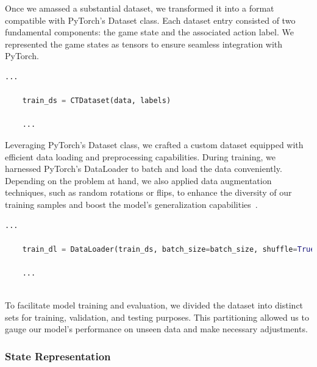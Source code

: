 Once we amassed a substantial dataset, we transformed it into a format compatible with PyTorch's Dataset class. 
Each dataset entry consisted of two fundamental components: the game state and the associated action label. We represented 
the game states as tensors to ensure seamless integration with PyTorch.

\begin{lstlisting}[language=Python]
    ...

    train_ds = CTDataset(data, labels)

    ...

\end{lstlisting}

Leveraging PyTorch's Dataset class, we crafted a custom dataset equipped with efficient data loading and preprocessing capabilities. 
During training, we harnessed PyTorch's DataLoader to batch and load the data conveniently. 
Depending on the problem at hand, we also applied data augmentation techniques, such as random rotations or flips, 
to enhance the diversity of our training samples and boost the model's generalization capabilities~\cite{Onl:dataAug}.

\begin{lstlisting}[language=Python]
    ...

    train_dl = DataLoader(train_ds, batch_size=batch_size, shuffle=True)

    ...
    
\end{lstlisting}

To facilitate model training and evaluation, we divided the dataset into distinct sets for training, validation, 
and testing purposes. This partitioning allowed us to gauge our model's performance on unseen data and make necessary adjustments.

\subsubsection{State Representation}

